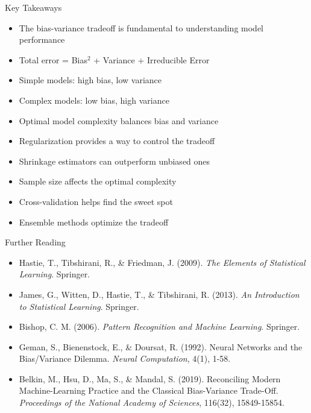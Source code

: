 \documentclass{beamer}
\begin{document}
\begin{frame}{Key Takeaways}
  \begin{itemize}
    \item The bias-variance tradeoff is fundamental to understanding model performance
    \item Total error = Bias$^2$ + Variance + Irreducible Error
    \item Simple models: high bias, low variance
    \item Complex models: low bias, high variance
    \item Optimal model complexity balances bias and variance
    \item Regularization provides a way to control the tradeoff
    \item Shrinkage estimators can outperform unbiased ones
    \item Sample size affects the optimal complexity
    \item Cross-validation helps find the sweet spot
    \item Ensemble methods optimize the tradeoff
  \end{itemize}
\end{frame}

\begin{frame}{Further Reading}
  \begin{itemize}
    \item Hastie, T., Tibshirani, R., \& Friedman, J. (2009). \textit{The Elements of Statistical Learning}. Springer.
    \item James, G., Witten, D., Hastie, T., \& Tibshirani, R. (2013). \textit{An Introduction to Statistical Learning}. Springer.
    \item Bishop, C. M. (2006). \textit{Pattern Recognition and Machine Learning}. Springer.
    \item Geman, S., Bienenstock, E., \& Doursat, R. (1992). Neural Networks and the Bias/Variance Dilemma. \textit{Neural Computation}, 4(1), 1-58.
    \item Belkin, M., Hsu, D., Ma, S., \& Mandal, S. (2019). Reconciling Modern Machine-Learning Practice and the Classical Bias-Variance Trade-Off. \textit{Proceedings of the National Academy of Sciences}, 116(32), 15849-15854.
  \end{itemize}
\end{frame}
\end{document}
